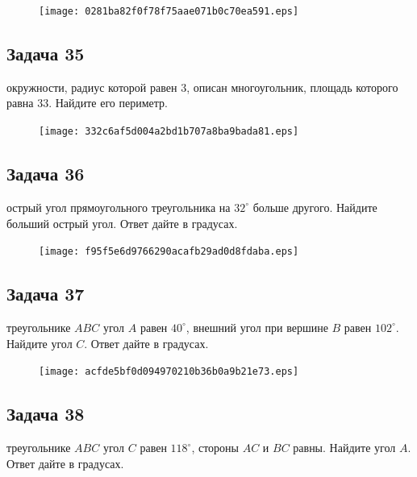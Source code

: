 \documentclass[a4paper,10pt]{article} %
\begin{document}
\begin{spacing}{1.0}
{\vspace{1.5cm}

\begin{figure}{\texttt{[image: 0281ba82f0f78f75aae071b0c70ea591.eps]}}\end{figure}
\subsection*{Задача 35}
 окружности, радиус которой равен 3, описан многоугольник, площадь которого равна 33. Найдите его периметр. 

\vspace{1.5cm}

\begin{figure}{\texttt{[image: 332c6af5d004a2bd1b707a8ba9bada81.eps]}}\end{figure}
\subsection*{Задача 36}
 острый угол прямоугольного треугольника на $32^\circ$ больше другого. Найдите больший острый угол. Ответ дайте в градусах.

\vspace{1.5cm}

\begin{figure}{\texttt{[image: f95f5e6d9766290acafb29ad0d8fdaba.eps]}}\end{figure}
\subsection*{Задача 37}
 треугольнике $ABC$ угол $A$ равен $40^\circ$, внешний угол при вершине $B$ равен $102^\circ$. Найдите угол $C$. Ответ дайте в градусах.

\vspace{1.5cm}

\begin{figure}{\texttt{[image: acfde5bf0d094970210b36b0a9b21e73.eps]}}\end{figure}
\subsection*{Задача 38}
 треугольнике $ABC$ угол $C$ равен $118^\circ$, стороны $AC$ и $BC$ равны. Найдите угол $A$. Ответ дайте в градусах.

\vspace{1.5cm}

}
\end{spacing}
\end{document}
